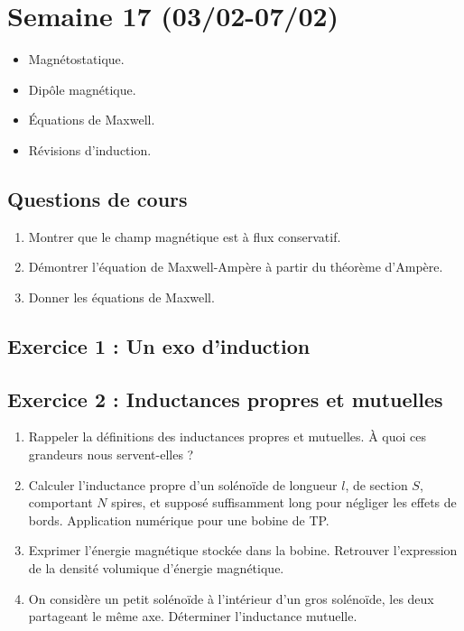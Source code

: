 \section{Semaine 17 (03/02-07/02)}


\begin{itemize}
	\item Magnétostatique.
	\item Dipôle magnétique.
	\item Équations de Maxwell.
	\item Révisions d'induction.
\end{itemize}

\subsection{Questions de cours}
\begin{enumerate}
	\item Montrer que le champ magnétique est à flux conservatif. 
	\item Démontrer l'équation de Maxwell-Ampère à partir du théorème d'Ampère.
	\item Donner les équations de Maxwell.
\end{enumerate}


\subsection{Exercice 1 : Un exo d'induction}

\subsection{Exercice 2 : Inductances propres et mutuelles}

\begin{enumerate}
	\item Rappeler la définitions des inductances propres et mutuelles. À quoi ces grandeurs nous servent-elles ?
	\item Calculer l'inductance propre d'un solénoïde de longueur $l$, de section $S$, comportant $N$ spires, et supposé suffisamment long pour négliger les effets de bords. Application numérique pour une bobine de TP.
	\item Exprimer l'énergie magnétique stockée dans la bobine. Retrouver l'expression de la densité volumique d'énergie magnétique.
	\item On considère un petit solénoïde à l'intérieur d'un gros solénoïde, les deux partageant le même axe. Déterminer l'inductance mutuelle.
\end{enumerate}

